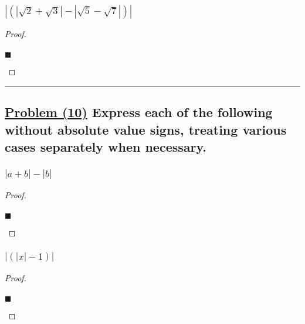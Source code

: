 \documentclass[letterpaper, 10 pt, conference]{ieeeconf}  %
\begin{document}
\subsubsection{\textbf{$\left\lvert (\left\lvert \sqrt{2} + \sqrt{3} \right\rvert - \left\lvert \sqrt{5} - \sqrt{7} \right\rvert) \right\rvert$}}
\begin{proof}
\begin{align}
    
\end{align}
\begin{flushright}
$\blacksquare$
\end{flushright}
\end{proof}

\noindent\rule{8cm}{0.4pt}
\subsection{\textbf{\underline{Problem (10)} Express each of the following without absolute value signs, treating various cases separately when necessary.}}

\subsubsection{\textbf{$\left\lvert a + b \right\rvert - \left\lvert b \right\rvert$}}
\begin{proof}
\begin{align}
    
\end{align}
\begin{flushright}
$\blacksquare$
\end{flushright}
\end{proof}

\subsubsection{\textbf{$\left\lvert (\left\lvert x \right\rvert - 1) \right\rvert$}}
\begin{proof}
\begin{align}
    
\end{align}
\begin{flushright}
$\blacksquare$
\end{flushright}
\end{proof}
\end{document}
